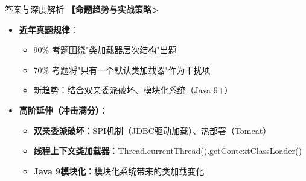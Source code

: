 \documentclass[12pt, a4paper]{ctexart}
\begin{document}
\begin{bluebox}{答案与深度解析}
\textbf{【命题趋势与实战策略>}
\begin{itemize}[label={}, leftmargin=*, nosep]
	\item \textbf{近年真题规律}：
	      \begin{itemize}[label={}, nosep]
		      \item 90\% 考题围绕"类加载器层次结构"出题
		      \item 70\% 考题将"只有一个默认类加载器"作为干扰项
		      \item 新趋势：结合双亲委派破坏、模块化系统（Java 9+）
	      \end{itemize}

	\item \textbf{高阶延伸（冲击满分）}：
	      \begin{itemize}[label={}, nosep]
		      \item \textbf{双亲委派破坏}：SPI机制（JDBC驱动加载）、热部署（Tomcat）
		      \item \textbf{线程上下文类加载器}：Thread.currentThread().getContextClassLoader()
		      \item \textbf{Java 9模块化}：模块化系统带来的类加载变化
	      \end{itemize}
\end{itemize}
\end{bluebox}
\end{document}
